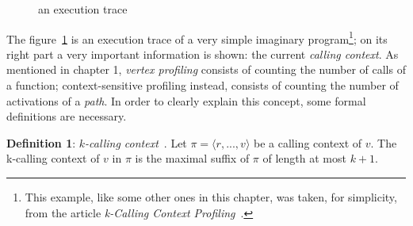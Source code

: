 \documentclass[a4paper,11pt]{report}
\begin{document}
\begin{figure}
\begin{center}


\caption{an execution trace}
\label{callex1}
\end{center}
\end{figure}
The figure~\ref{callex1} is an execution trace of a very simple imaginary program\footnote{This example, like some other ones in this chapter, was taken, for simplicity, from the article \emph{k-Calling Context Profiling}~\cite{kccf}.}; on its right part a very important information is shown: the current \emph{calling context}. 
As mentioned in chapter 1, \emph{vertex profiling} consists of counting the number of calls of a function; context-sensitive profiling instead, consists of counting the number of activations of a \emph{path}. In order to clearly explain this concept, some formal definitions are necessary.

\textbf{Definition 1}: \emph{$k$-calling context}~\cite{kccf}. 
Let $\pi = \langle r,...,v\rangle$ be a calling context of $v$. The k-calling context of $v$
in $\pi$ is the maximal suffix of $\pi$ of length at most $k+1$.\\
\end{document}
